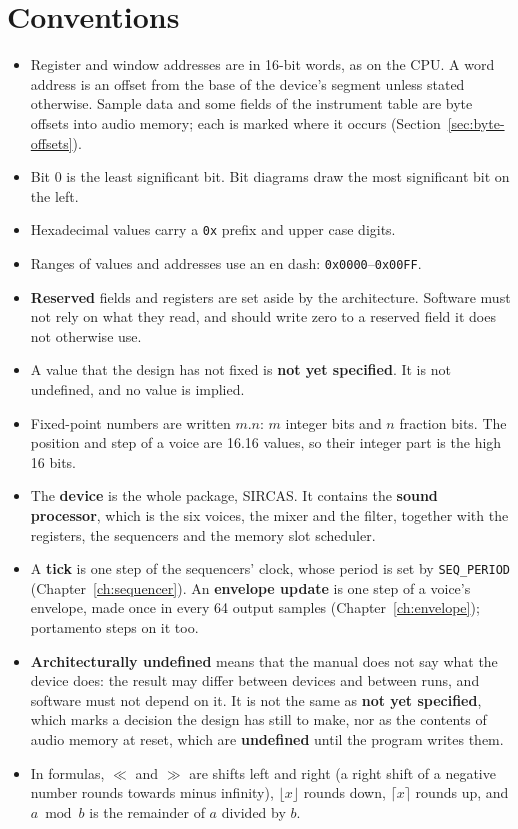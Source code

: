 \section{Conventions}

\begin{itemize}
	\item Register and window addresses are in 16-bit words, as on the CPU. A word address is an offset from the base of the
	      device's segment unless stated otherwise. Sample data and some fields of the instrument table are byte offsets into
	      audio memory; each is marked where it occurs (Section~\ref{sec:byte-offsets}).
	\item Bit 0 is the least significant bit. Bit diagrams draw the most significant bit on the left.
	\item Hexadecimal values carry a \texttt{0x} prefix and upper case digits.
	\item Ranges of values and addresses use an en dash: \texttt{0x0000}--\texttt{0x00FF}.
	\item \textbf{Reserved} fields and registers are set aside by the architecture. Software must not rely on what they
	      read, and should write zero to a reserved field it does not otherwise use.
	\item A value that the design has not fixed is \textbf{not yet specified}. It is not undefined, and no value is implied.
	\item Fixed-point numbers are written $m.n$: $m$ integer bits and $n$ fraction bits. The position and step of a voice are
	      16.16 values, so their integer part is the high 16 bits.
	\item The \textbf{device} is the whole package, SIRCAS. It contains the \textbf{sound processor}, which is the six voices,
	      the mixer and the filter, together with the registers, the sequencers and the memory slot scheduler.
	\item A \textbf{tick} is one step of the sequencers' clock, whose period is set by \texttt{SEQ\_PERIOD}
	      (Chapter~\ref{ch:sequencer}). An \textbf{envelope update} is one step of a voice's envelope, made once in every 64
	      output samples (Chapter~\ref{ch:envelope}); portamento steps on it too.
	\item \textbf{Architecturally undefined} means that the manual does not say what the device does: the result may differ
	      between devices and between runs, and software must not depend on it. It is not the same as \textbf{not yet
		      specified}, which marks a decision the design has still to make, nor as the contents of audio memory at reset, which
	      are \textbf{undefined} until the program writes them.
	\item In formulas, $\ll$ and $\gg$ are shifts left and right (a right shift of a negative number rounds towards minus
	      infinity), $\lfloor x \rfloor$ rounds down, $\lceil x \rceil$ rounds up, and $a \bmod b$ is the remainder of $a$
	      divided by $b$.
\end{itemize}
